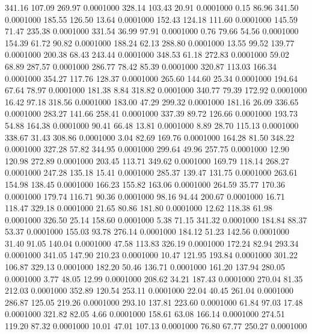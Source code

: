  341.16  107.09  269.97   0.0001000
 328.14  103.43   20.91   0.0001000
   0.15   86.96  341.50   0.0001000
 185.55  126.50   13.64   0.0001000
 152.43  124.18  111.60   0.0001000
 145.59   71.47  235.38   0.0001000
 331.54   36.99   97.91   0.0001000
   0.76   79.66   54.56   0.0001000
 154.39   61.72   90.82   0.0001000
 188.24   62.13  288.80   0.0001000
  13.55   99.52  139.77   0.0001000
 200.38   68.43  243.44   0.0001000
 348.53   61.18  272.83   0.0001000
  59.02   68.89  287.57   0.0001000
 286.77   78.42   85.39   0.0001000
 320.87  113.03  166.34   0.0001000
 354.27  117.76  128.37   0.0001000
 265.60  144.60   25.34   0.0001000
 194.64   67.64   78.97   0.0001000
 181.38    8.84  318.82   0.0001000
 340.77   79.39  172.92   0.0001000
  16.42   97.18  318.56   0.0001000
 183.00   47.29  299.32   0.0001000
 181.16   26.09  336.65   0.0001000
 283.27  141.66  258.41   0.0001000
 337.39   89.72  126.66   0.0001000
 193.73   54.88  164.38   0.0001000
  90.41   66.48   13.81   0.0001000
   8.89   28.70  115.13   0.0001000
 338.67   31.43  308.86   0.0001000
   3.04   82.69  169.76   0.0001000
 164.28   81.50  348.22   0.0001000
 327.28   57.82  344.95   0.0001000
 299.64   49.96  257.75   0.0001000
  12.90  120.98  272.89   0.0001000
 203.45  113.71  349.62   0.0001000
 169.79  118.14  268.27   0.0001000
 247.28  135.18   15.41   0.0001000
 285.37  139.47  131.75   0.0001000
 263.61  154.98  138.45   0.0001000
 166.23  155.82  163.06   0.0001000
 264.59   35.77  170.36   0.0001000
 179.74  116.71   90.36   0.0001000
  98.16   94.44  200.67   0.0001000
  16.71  118.47  329.18   0.0001000
  21.65   80.86  181.80   0.0001000
  12.62  118.38   61.98   0.0001000
 326.50   25.14  158.60   0.0001000
   5.38   71.15  341.32   0.0001000
 184.84   88.37   53.37   0.0001000
 155.03   93.78  276.14   0.0001000
 184.12   51.23  142.56   0.0001000
  31.40   91.05  140.04   0.0001000
  47.58  113.83  326.19   0.0001000
 172.24   82.94  293.34   0.0001000
 341.05  147.90  210.23   0.0001000
  10.47  121.95  193.84   0.0001000
 301.22  106.87  329.13   0.0001000
 182.20   50.46  136.71   0.0001000
 161.20  137.94  280.05   0.0001000
   3.77   48.05   12.99   0.0001000
 208.62   34.21  187.43   0.0001000
 270.04   81.35  212.03   0.0001000
 352.89  120.54  253.11   0.0001000
  22.04   40.45  261.04   0.0001000
 286.87  125.05  219.26   0.0001000
 293.10  137.81  223.60   0.0001000
  61.84   97.03   17.48   0.0001000
 321.82   82.05    4.66   0.0001000
 158.61   63.08  166.14   0.0001000
 274.51  119.20   87.32   0.0001000
  10.01   47.01  107.13   0.0001000
  76.80   67.77  250.27   0.0001000
